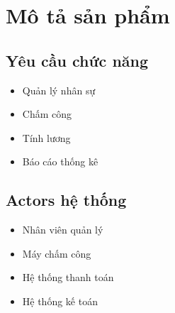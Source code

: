 \section{Mô tả sản phẩm}
\subsection{Yêu cầu chức năng}
\begin{itemize}
    \item Quản lý nhân sự
    \item Chấm công
    \item Tính lương
    \item Báo cáo thống kê
\end{itemize}

\subsection{Actors hệ thống}
\begin{itemize}
    \item Nhân viên quản lý
    \item Máy chấm công
    \item Hệ thống thanh toán
    \item Hệ thống kế toán
\end{itemize}

